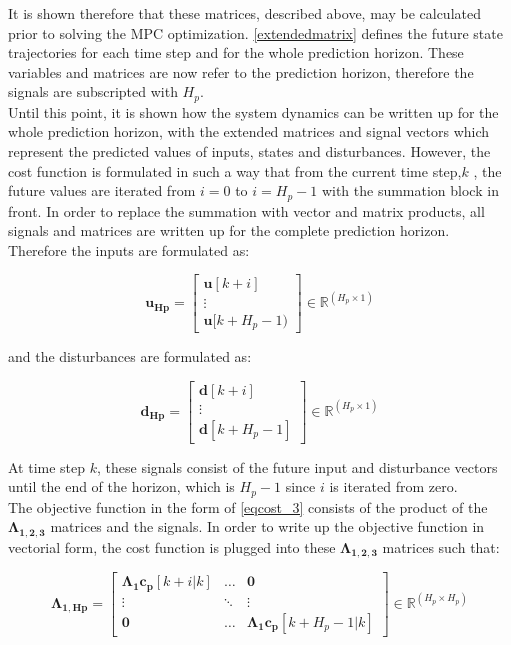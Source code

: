 It is shown therefore that these matrices, described above, may be calculated prior to solving the MPC optimization. \eqref{extendedmatrix} defines the future state trajectories for each time step and for the whole prediction horizon. These variables and matrices are now refer to the prediction horizon, therefore the signals are subscripted with $H_p$. 
\\
Until this point, it is shown how the system dynamics can be written up for the whole prediction horizon, with the extended matrices and signal vectors which represent the predicted values of inputs, states and disturbances. However, the cost function is formulated in such a way that from the current time step,$k$ , the future values are iterated from $i = 0$ to $i = H_p - 1$ with the summation block in front. In order to replace the summation with vector and matrix products, all signals and matrices are written up for the complete prediction horizon. Therefore the inputs are formulated as:

\begin{equation}
\bm{u_{Hp}} =  
 \begin{bmatrix}
  \bm{u}[k+i]\\
  \vdots  \\
  \bm{u}[k+H_p-1)   
 \end{bmatrix}
 \in \pmb{\mathbb{R}}^{(H_p \times 1)}
\end{equation}

and the disturbances are formulated as:

\begin{equation}
\bm{d_{Hp}} =  
 \begin{bmatrix}
  \bm{d}[k+i]\\
  \vdots  \\
  \bm{d}[k+H_p-1]   
 \end{bmatrix}
 \in \pmb{\mathbb{R}}^{(H_p \times 1)}
\end{equation}

At time step $k$, these signals consist of the future input and disturbance vectors until the end of the horizon, which is $H_p - 1$ since $i$ is iterated from zero. 
\\
The objective function in the form of \eqref{eqcost_3} consists of the product of the$ \bm{\Lambda_{1,2,3}}$ matrices and the signals. In order to write up the objective function in vectorial form, the cost function is plugged into these $\bm{\Lambda_{1,2,3}}$ matrices such that:

\begin{equation}
\bm{\Lambda_{1,Hp}} =
 \begin{bmatrix}
 \bm{\Lambda_1} \bm{c_p}[k+i|k] & \hdots & \bm{0} \\
 \vdots & \ddots & \vdots\\
 \bm{0} & \hdots & \bm{\Lambda_1 c_p}[k+H_p-1|k] 
 \end{bmatrix}
 \in \pmb{\mathbb{R}}^{(H_p \times H_p)}
\end{equation} 


